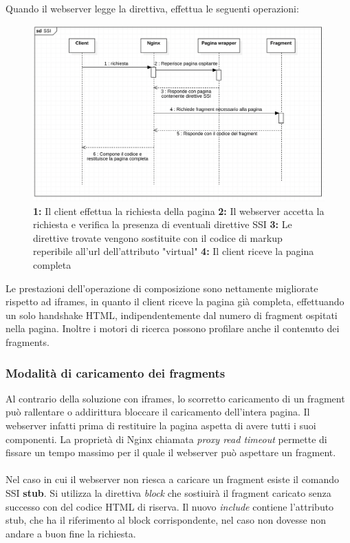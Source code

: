 Quando il webserver legge la direttiva, effettua le seguenti operazioni:

\begin{figure}[H]
    \centering
    \includegraphics[width=140mm]{img/SSI sequence}
    \caption{ 
    \textbf{1:} Il client effettua la richiesta della pagina
    \textbf{2:} Il webserver accetta la richiesta e verifica la presenza di eventuali direttive SSI
    \textbf{3:} Le direttive trovate vengono sostituite con il codice di markup reperibile all'url dell'attributo "virtual"
    \textbf{4:} Il client riceve la pagina completa
    }
  \end{figure}


Le prestazioni dell'operazione di composizione sono nettamente migliorate rispetto ad iframes, 
in quanto il client riceve la pagina già completa, effettuando un solo handshake HTML, indipendentemente dal numero
di fragment ospitati nella pagina. Inoltre i motori di ricerca possono profilare anche il contenuto dei fragments.

\subsubsection{Modalità di caricamento dei fragments}
Al contrario della soluzione con iframes, lo scorretto caricamento di un fragment può rallentare o addirittura bloccare 
il caricamento dell'intera pagina. Il webserver infatti prima di restituire la pagina aspetta di avere tutti  i suoi componenti.
La proprietà di Nginx chiamata \emph{proxy read timeout} permette di fissare un tempo massimo per il quale il webserver 
può aspettare un fragment.
\\\\
Nel caso in cui il webserver non riesca a caricare un fragment esiste il comando SSI \textbf{stub}.
Si utilizza la direttiva \emph{block} che sostiuirà il fragment caricato senza successo con del codice HTML di riserva.
Il nuovo \emph{include} contiene l'attributo stub, che ha il riferimento al block corrispondente, nel caso non dovesse non andare
a buon fine la richiesta.
\\

